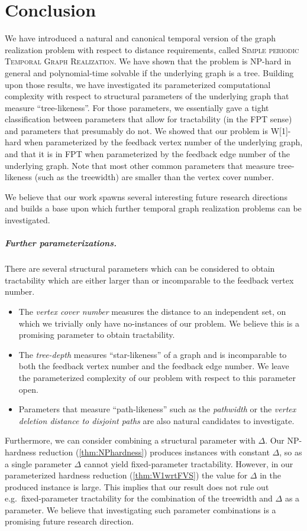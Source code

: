 \documentclass[a4paper,UKenglish,cleveref, autoref, thm-restate]{lipics-v2021}
\newcommand{\deltaExactLong}{\textsc{Simple periodic Temporal Graph Realization}}
\begin{document}



\section{Conclusion}\label{sec:conclusion}
We have introduced a natural and canonical temporal version of the graph realization problem with respect to distance requirements, called \deltaExactLong. 
We have shown that the problem is NP-hard in general and polynomial-time solvable if the underlying graph is a tree.
Building upon those results, we have investigated its parameterized computational complexity with respect to structural parameters of the underlying graph that measure ``tree-likeness''. For those parameters, we essentially gave a tight classification between parameters that allow for tractability (in the FPT sense) and parameters that presumably do not.
We showed that our problem is W[1]-hard when parameterized by the feedback vertex number of the underlying graph, and that it is in FPT when parameterized by the feedback edge number of the underlying graph. Note that most other common parameters that measure tree-likeness (such as the treewidth) are smaller than the vertex cover number.

We believe that our work spawns several interesting future research directions and builds a base upon which further temporal graph realization problems can be investigated.

\subparagraph{Further parameterizations.} There are several structural parameters which can be considered to obtain tractability which are either larger than or incomparable to the feedback vertex number.
\begin{itemize}
    \item The \emph{vertex cover number} measures the distance to an independent set, on which we trivially only have no-instances of our problem. We believe this is a promising parameter to obtain tractability.
    \item The \emph{tree-depth} measures ``star-likeness'' of a graph and is incomparable to both the feedback vertex number and the feedback edge number. We leave the parameterized complexity of our problem with respect to this parameter open.
    \item Parameters that measure ``path-likeness'' such as the \emph{pathwidth} or the \emph{vertex deletion distance to disjoint paths} are also natural candidates to investigate.
\end{itemize}
Furthermore, we can consider combining a structural parameter with $\Delta$. Our NP-hardness reduction (\cref{thm:NPhardness}) produces instances with constant $\Delta$, so as a single parameter $\Delta$ cannot yield fixed-parameter tractability. However, in our parameterized hardness reduction (\cref{thm:W1wrtFVS}) the value for $\Delta$ in the produced instance is large. This implies that our result does not rule out e.g.\ fixed-parameter tractability for the combination of the treewidth and $\Delta$ as a parameter. We believe that investigating such parameter combinations is a promising future research direction.
\end{document}
